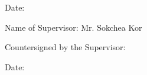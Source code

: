 \begin{adjustwidth}{0.2cm}{0.2cm}
    \vspace{0.5cm}
    \setlength{\parindent}{0pt}
    {\large Date: \dotfill\par}

    \vspace{1cm}
    \setlength{\parindent}{0pt}
    {\large Name of Supervisor: Mr. Sokchea Kor\par}
    
    \vspace{0.5cm}
    \setlength{\parindent}{0pt}
    {\large Countersigned by the Supervisor: \dotfill\par}
    
    \vspace{0.5cm}
    \setlength{\parindent}{0pt}
    {\large Date: \dotfill\par}

    
\end{adjustwidth}